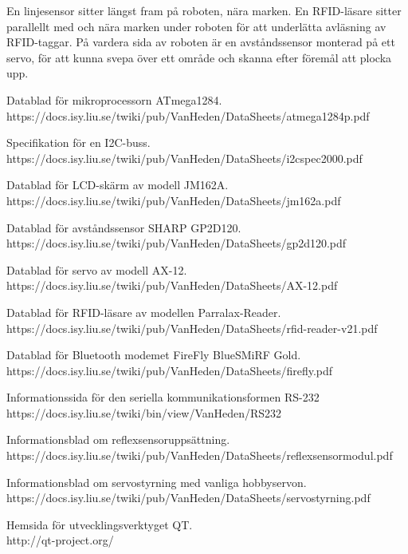 \documentclass[a4paper,12pt]{article}
\begin{document}
En linjesensor sitter längst fram på roboten, nära marken. En RFID-läsare sitter parallellt med och nära marken under roboten för att underlätta avläsning av RFID-taggar. På vardera sida av roboten är en avståndssensor monterad på ett servo, för att kunna svepa över ett område och skanna efter föremål att plocka upp.








\newpage
\begin{thebibliography}{9}
 Datablad för mikroprocessorn ATmega1284.
\\https://docs.isy.liu.se/twiki/pub/VanHeden/DataSheets/atmega1284p.pdf

 Specifikation för en I2C-buss.
\\ https://docs.isy.liu.se/twiki/pub/VanHeden/DataSheets/i2cspec2000.pdf

 Datablad för LCD-skärm av modell JM162A. 
\\https://docs.isy.liu.se/twiki/pub/VanHeden/DataSheets/jm162a.pdf

 Datablad för avståndssensor SHARP GP2D120.
\\ https://docs.isy.liu.se/twiki/pub/VanHeden/DataSheets/gp2d120.pdf

 Datablad för servo av modell AX-12.
\\ https://docs.isy.liu.se/twiki/pub/VanHeden/DataSheets/AX-12.pdf

 Datablad för RFID-läsare av modellen Parralax-Reader.
\\ https://docs.isy.liu.se/twiki/pub/VanHeden/DataSheets/rfid-reader-v21.pdf

 Datablad för Bluetooth modemet FireFly BlueSMiRF Gold.
\\https://docs.isy.liu.se/twiki/pub/VanHeden/DataSheets/firefly.pdf

 Informationssida för den seriella kommunikationsformen RS-232
\\https://docs.isy.liu.se/twiki/bin/view/VanHeden/RS232

 Informationsblad om reflexsensoruppsättning.
\\https://docs.isy.liu.se/twiki/pub/VanHeden/DataSheets/reflexsensormodul.pdf

 Informationsblad om servostyrning med vanliga hobbyservon.
\\https://docs.isy.liu.se/twiki/pub/VanHeden/DataSheets/servostyrning.pdf

 Hemsida för utvecklingsverktyget QT.
\\http://qt-project.org/

\end{thebibliography}

\newpage
\appendix

\end{document}
